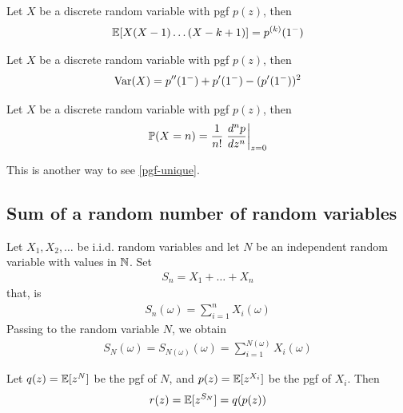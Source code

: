 \documentclass{../../template/note}
\begin{document}
    \begin{proposition}
        Let \(X\) be a discrete random variable with pgf \(p(z)\), then
        \begin{align*}
            \mathbb E[X(X-1)\dots(X-k+1)] = p^{(k)}(1^-)
        \end{align*}
    \end{proposition}
    
    \begin{corollary}
        Let \(X\) be a discrete random variable with pgf \(p(z)\), then
        \begin{align*}
            \operatorname{Var}(X) = p''(1^-) + p'(1^-) - (p'(1^-))^2
        \end{align*}
    \end{corollary}
    
    \begin{proposition}
        Let \(X\) be a discrete random variable with pgf \(p(z)\), then
        \begin{align*}
            \mathbb P(X = n) = \frac 1{n!}\left.\frac{d^np}{dz^n}\right|_{z=0}
        \end{align*}
    \end{proposition}
    
    \begin{remark*}
        This is another way to see \cref{pgf-unique}.
    \end{remark*}
    
    \subsection{Sum of a random number of random variables}

    Let \(X_1, X_2, \dots\) be i.i.d. random variables and let \(N\) be an independent random variable with values in \(\mathbb N\). Set
    \begin{align*}
        S_n = X_1 + \dots + X_n
    \end{align*}
    that, is
    \begin{align*}
        S_n(\omega) = \sum_{i=1}^n X_i(\omega)
    \end{align*}
    Passing to the random variable \(N\), we obtain
    \begin{align*}
        S_N(\omega) = S_{N(\omega)}(\omega) = \sum_{i=1}^{N(\omega)} X_i(\omega)
    \end{align*}
    
    \begin{lemma}
        Let \(q(z) = \mathbb E[z^N]\) be the pgf of \(N\), and \(p(z) = \mathbb E[z^{X_i}]\) be the pgf of \(X_i\). Then
        \begin{align*}
            r(z) = \mathbb E[z^{S_N}] = q(p(z))
        \end{align*}
    \end{lemma}
    
\end{document}

